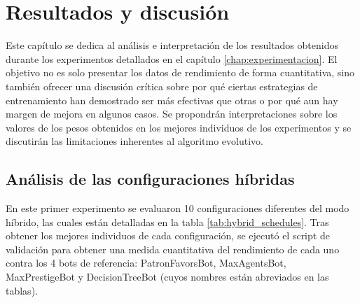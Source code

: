 \chapter{Resultados y discusión} \label{chap:resultados}

Este capítulo se dedica al análisis e interpretación de los resultados obtenidos durante los experimentos detallados en el capítulo \ref{chap:experimentacion}. El objetivo no es solo presentar los datos de rendimiento de forma cuantitativa, sino también ofrecer una discusión crítica sobre por qué ciertas estrategias de entrenamiento han demostrado ser más efectivas que otras o por qué aun hay margen de mejora en algunos casos. Se propondrán interpretaciones sobre los valores de los pesos obtenidos en los mejores individuos de los experimentos y se discutirán las limitaciones inherentes al algoritmo evolutivo.

\section{Análisis de las configuraciones híbridas} \label{sec:analisis_configuraciones_hibridas}

En este primer experimento se evaluaron 10 configuraciones diferentes del modo híbrido, las cuales están detalladas en la tabla \ref{tab:hybrid_schedules}. Tras obtener los mejores individuos de cada configuración, se ejecutó el script de validación para obtener una medida cuantitativa del rendimiento de cada uno contra los 4 bots de referencia: PatronFavorsBot, MaxAgentsBot, MaxPrestigeBot y DecisionTreeBot (cuyos nombres están abreviados en las tablas).

